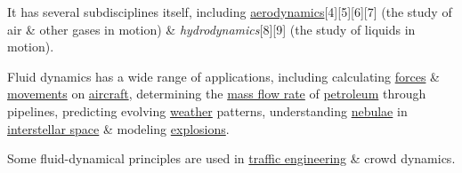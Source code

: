\documentclass{article}
\begin{document}
\begin{enumerate}
	It has several subdisciplines itself, including \href{https://en.wikipedia.org/wiki/Aerodynamics}{aerodynamics}[4][5][6][7] (the study of air \& other gases in motion) \& \textit{hydrodynamics}[8][9] (the study of liquids in motion).
	
	Fluid dynamics has a wide range of applications, including calculating \href{https://en.wikipedia.org/wiki/Force}{forces} \& \href{https://en.wikipedia.org/wiki/Moment_(physics)}{movements} on \href{https://en.wikipedia.org/wiki/Aircraft}{aircraft}, determining the \href{https://en.wikipedia.org/wiki/Mass_flow_rate}{mass flow rate} of \href{https://en.wikipedia.org/wiki/Petroleum}{petroleum} through pipelines, predicting evolving \href{https://en.wikipedia.org/wiki/Weather}{weather} patterns, understanding \href{https://en.wikipedia.org/wiki/Nebula}{nebulae} in \href{https://en.wikipedia.org/wiki/Interstellar_space}{interstellar space} \& modeling \href{https://en.wikipedia.org/wiki/Explosions}{explosions}.
	
	Some fluid-dynamical principles are used in \href{https://en.wikipedia.org/wiki/Traffic_engineering_(transportation)}{traffic engineering} \& crowd dynamics.
\end{enumerate}
\end{document}
